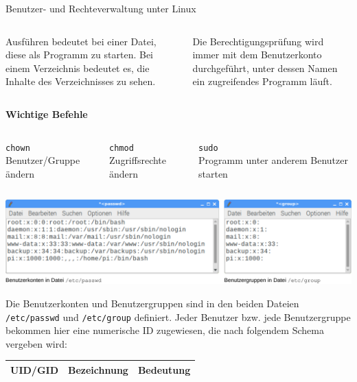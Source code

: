{\begin{frame}[allowframebreaks]{Benutzer- und Rechteverwaltung unter Linux}
\begin{columns}[onlytextwidth]
{            \bigskip

            \glqq{}Ausführen\grqq{} bedeutet bei einer Datei, diese als Programm
            zu starten. Bei einem Verzeichnis bedeutet es, die Inhalte des
            Verzeichnisses zu sehen.

            \bigskip

            Die Berechtigungsprüfung wird immer mit dem Benutzerkonto durchgeführt,
            unter dessen Namen ein zugreifendes Programm läuft.
        }
    \end{columns}

    \medskip
    \textbf{Wichtige Befehle}
    \smallskip

    \begin{columns}[onlytextwidth]
        \texttt{chown} \\ Benutzer/Gruppe ändern

        \texttt{chmod} \\ Zugriffsrechte ändern

        \texttt{sudo} \\ Programm unter anderem Benutzer starten
    \end{columns}

    \framebreak

    \begin{center}
        \includegraphics[width=\textwidth]{8-linux/img/rechte-konfiguration}
    \end{center}

    \parbox{\linewidth}{
        Die Benutzerkonten und Benutzergruppen sind in den beiden Dateien
        \texttt{/etc/passwd} und \texttt{/etc/group} definiert. Jeder
        Benutzer bzw. jede Benutzergruppe bekommen hier eine numerische ID
        zugewiesen, die nach folgendem Schema vergeben wird:
    }

    \medskip

    {
        \scriptsize
        \renewcommand{\arraystretch}{1.4}
        \setlength{\tabcolsep}{0em}

        \begin{tabularx}{\textwidth}{p{} p{} X}
            \hline
            \textbf{UID/GID} & \textbf{Bezeichnung} & \textbf{Bedeutung} \\
            \hline


\end{tabularx}}
\end{frame}}
